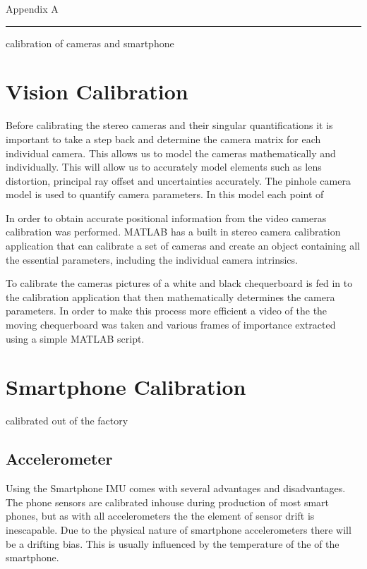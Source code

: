 \pagestyle{plain}


{\Large Appendix A}
\vskip 5mm
\hrule
\vskip 5mm


calibration of cameras and smartphone

\section*{Vision Calibration}
Before calibrating the stereo cameras and their singular quantifications it is important to take a step back and determine the camera matrix for each individual camera. This allows us to model the cameras mathematically and individually. This will allow us to accurately model elements such as lens distortion, principal ray offset and uncertainties accurately. The pinhole camera model is used to quantify camera parameters. In this model each point of 

In order to obtain accurate positional information from the video cameras calibration was performed. MATLAB has a built in stereo camera calibration application that can calibrate a set of cameras and create an object containing all the essential parameters, including the individual camera intrinsics.

To calibrate the cameras pictures of a white and black chequerboard is fed in to the calibration application that then mathematically determines the camera parameters. In order to make this process more efficient a video of the the moving chequerboard was taken and various frames of importance extracted using a simple MATLAB script. 

\section*{Smartphone Calibration}
calibrated out of the factory

\subsection*{Accelerometer}
Using the Smartphone IMU comes with several advantages and disadvantages. The phone sensors are calibrated inhouse during production of most smart phones, but as with all accelerometers the the element of sensor drift is inescapable. Due to the physical nature of smartphone accelerometers there will be a drifting bias. This is usually influenced by the temperature of the of the smartphone.

